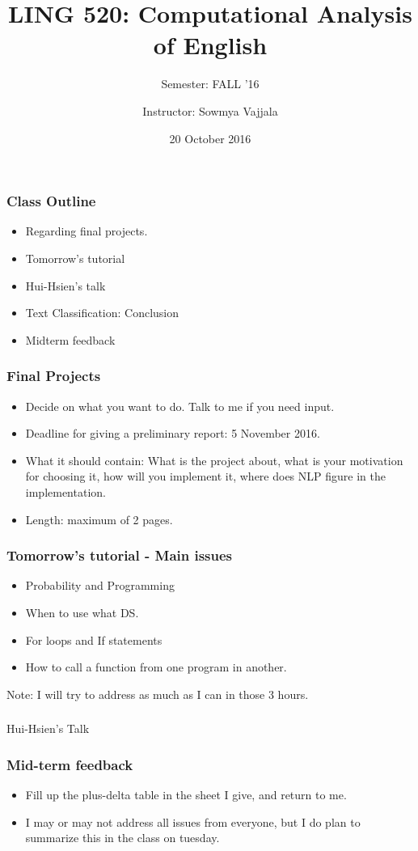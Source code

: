 \documentclass{beamer}
\author[Sowmya Vajjala]{Instructor: Sowmya Vajjala}
\title[LING 520]{LING 520: Computational Analysis of English}
\subtitle{Semester: FALL '16}
\date{20 October 2016}
\institute{Iowa State University, USA}
\begin{document}
\begin{frame}\titlepage
\end{frame}

\begin{frame}
\frametitle{Class Outline}
\begin{itemize}
\item Regarding final projects.
\item Tomorrow's tutorial
\item Hui-Hsien's talk
\item Text Classification: Conclusion
\item Midterm feedback
\end{itemize}
\end{frame}

\begin{frame}
\frametitle{Final Projects}
\begin{itemize}
\item Decide on what you want to do. Talk to me if you need input. 
\item Deadline for giving a preliminary report: 5 November 2016.
\item What it should contain: What is the project about, what is your motivation for choosing it, how will you implement it, where does NLP figure in the implementation.
\item Length: maximum of 2 pages. 
\end{itemize}
\end{frame}

\begin{frame}
\frametitle{Tomorrow's tutorial - Main issues}
\begin{itemize}
\item Probability and Programming %
\item When to use what DS.%
\item For loops and If statements %
\item How to call a function from one program in another. 
\end{itemize}
Note: I will try to address as much as I can in those 3 hours. 
\end{frame}

\begin{frame}
\frametitle{}
\Large Hui-Hsien's Talk
\end{frame}

\begin{frame}
\frametitle{Mid-term feedback}
\begin{itemize}
\item Fill up the plus-delta table in the sheet I give, and return to me.
\item I may or may not address all issues from everyone, but I do plan to summarize this in the class on tuesday.
\end{itemize}
\end{frame}
\end{document}
